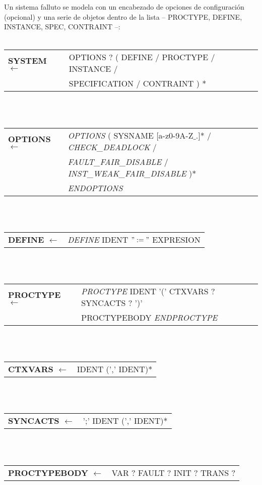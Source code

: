 \documentclass[titlepage, 12pt]{book}
\begin{document}
Un sistema falluto se modela con un encabezado de opciones de configuraci\'on (opcional) y una serie de objetos dentro de la lista -- PROCTYPE, DEFINE, INSTANCE, SPEC, CONTRAINT --:\\\\

\noindent \begin{tabular}{>{\bfseries}ll}
SYSTEM $\longleftarrow$ & OPTIONS ? ( DEFINE / PROCTYPE / INSTANCE /\\
						&  SPECIFICATION / CONTRAINT ) *
\end{tabular}
~\\\\
\begin{tabular}{>{\bfseries}ll}
OPTIONS $\longleftarrow$ & \textit{OPTIONS} ( SYSNAME [a-z0-9A-Z$\_$.]* / \textit{CHECK\_DEADLOCK} /\\ 
                         & \textit{FAULT\_FAIR\_DISABLE} / \textit{INST\_WEAK\_FAIR\_DISABLE} )* \\
                         & \textit{ENDOPTIONS}
\end{tabular}
~\\\\
\begin{tabular}{>{\bfseries}ll}
DEFINE $\longleftarrow$ & \textit{DEFINE} IDENT $":="$  EXPRESION
\end{tabular}
~\\\\
\begin{tabular}{>{\bfseries}ll}
PROCTYPE $\longleftarrow$ & \textit{PROCTYPE} IDENT '(' CTXVARS ? SYNCACTS ? ')' \\
						  & PROCTYPEBODY \textit{ENDPROCTYPE}
\end{tabular}
~\\\\
\begin{tabular}{>{\bfseries}ll}
CTXVARS $\longleftarrow$ & IDENT (',' IDENT)*
\end{tabular}
~\\\\
\begin{tabular}{>{\bfseries}ll}
SYNCACTS $\longleftarrow$ & ';' IDENT (',' IDENT)*
\end{tabular}
~\\\\
\begin{tabular}{>{\bfseries}ll}
PROCTYPEBODY $\longleftarrow$ & VAR ? FAULT ? INIT ? TRANS ?
\end{tabular}
~\\\\
\end{document}
